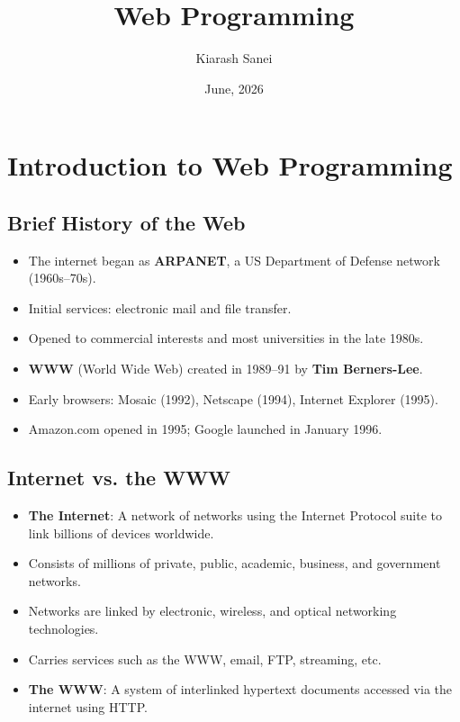 \documentclass[hidelinks]{article}
\title{\color{carminered}\textbf{Web Programming}}
\author{\color{Thistle}Kiarash Sanei}
\date{\color{SkyBlue}June, 2026}
\begin{document}
\maketitle
\begin{Large}
\tableofcontents
\end{Large}
\newpage

\section{Introduction to Web Programming}

\subsection{Brief History of the Web}
\begin{itemize}
  \item The internet began as \textbf{ARPANET}, a US Department of Defense network (1960s--70s).
  \item Initial services: electronic mail and file transfer.
  \item Opened to commercial interests and most universities in the late 1980s.
  \item \textbf{WWW} (World Wide Web) created in 1989--91 by \textbf{Tim Berners-Lee}.
  \item Early browsers: Mosaic (1992), Netscape (1994), Internet Explorer (1995).
  \item Amazon.com opened in 1995; Google launched in January 1996.
\end{itemize}

\subsection{Internet vs. the WWW}
\begin{itemize}
  \item \textbf{The Internet}: A network of networks using the Internet Protocol suite to link billions of devices worldwide.
  \item Consists of millions of private, public, academic, business, and government networks.
  \item Networks are linked by electronic, wireless, and optical networking technologies.
  \item Carries services such as the WWW, email, FTP, streaming, etc.
  \item \textbf{The WWW}: A system of interlinked hypertext documents accessed via the internet using HTTP.
\end{itemize}
\end{document}
